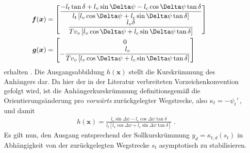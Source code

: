 \begin{subequations}
\begin{align*}
\negspace\negspace
	\boldsymbol f(\boldsymbol x) &= \begin{bmatrix} \dfrac{-l_t\tan \delta+l_v\sin \Delta \psi-l_c\cos \Delta \psi\tan \delta}{l_t\left[l_v\cos \Delta \psi+l_c\sin \Delta \psi\tan \delta\right]} \\ \dfrac{l_v\delta}{T v_v\left[l_v\cos \Delta \psi+l_c\sin \Delta \psi\tan \delta\right]} \end{bmatrix}\\
\negspace\negspace
	\boldsymbol g(\boldsymbol x) &= \begin{bmatrix} 0 \\ -\dfrac{l_v}{T v_v\left[l_v\cos \Delta \psi+l_c\sin \Delta \psi\tan \delta\right]}\end{bmatrix}
\end{align*}
\end{subequations}
erhalten . Die Ausgangsabbildung $h(\boldsymbol x)$ stellt 
die Kurskrümmung des Anhängers dar.
Da hier der in der Literatur verbreiteten Vorzeichenkonvention gefolgt wird, ist die Anhängerkurskrümmung definitionsgemäß die Orientierungsänderung pro \emph{vorwärts} zurückgelegter Wegstrecke, also $\kappa_t = -\psi_t'$\,, und damit
\begin{align}
	h(\boldsymbol x) = \frac{l_v\sin\Delta\psi-l_c\cos\Delta\psi\tan\delta}{l_t\left[l_v\cos\Delta\psi+l_c\sin\Delta\psi\tan\delta\right]}\;.\label{eq:assistiert:kruemmung}
\end{align}
Es gilt nun, den Ausgang entsprechend der Sollkurskrümmung $y_d= \kappa_{t,d}(s_t)$ in Abhängigkeit von der zurückgelegten Wegstrecke $s_t$ asymptotisch zu stabilisieren.




